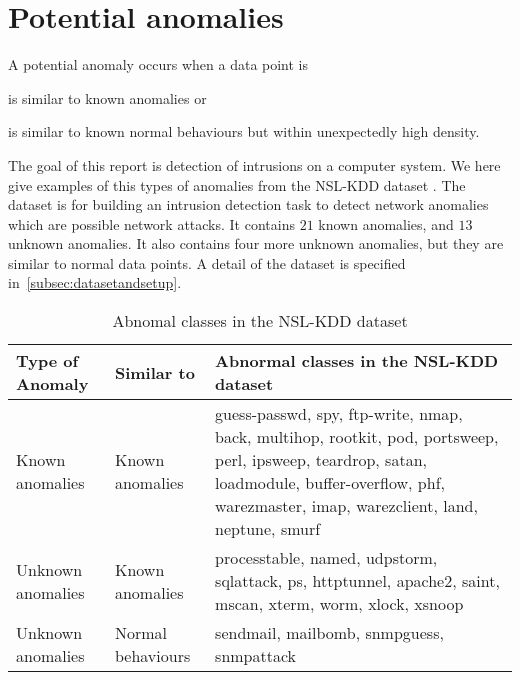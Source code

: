 \section{Potential anomalies}
A potential anomaly occurs when a data point is \begin{inparaenum}
\item is similar to known anomalies %
or 
\item is similar to known normal behaviours but within unexpectedly high density.
\end{inparaenum} 

The goal of this report is detection of intrusions on a computer system. 
We here give examples of this types of anomalies from the NSL-KDD dataset \cite{tavallaee09}. 
The dataset is for building an intrusion detection task to detect network anomalies which are possible network attacks. 
It contains $21$ known anomalies, and $13$ unknown anomalies. 
It also contains four more unknown anomalies, but they are similar to normal data points.
A detail of the dataset is specified in~\ref{subsec:datasetandsetup}. 

\begin{table}[h]
\begin{center}
\begin{tabular}{| l | l | p{5cm} |}
\hline
Type of Anomaly & Similar to & Abnormal classes in the NSL-KDD dataset \\
\hline
Known anomalies & Known anomalies & guess-passwd, spy, ftp-write, nmap, back, multihop, rootkit, pod, portsweep, perl, ipsweep, teardrop, satan, loadmodule, buffer-overflow, phf, warezmaster, imap, warezclient, land, neptune, smurf \\ %
\hline
Unknown anomalies & Known anomalies & processtable, named, udpstorm, sqlattack, ps, httptunnel, apache2, saint, mscan, xterm, worm, xlock, xsnoop \\ %
\hline
Unknown anomalies & Normal behaviours & sendmail, mailbomb, snmpguess, snmpattack \\ %
\hline
\end{tabular}
\end{center}
\caption{Abnomal classes in the NSL-KDD dataset}
\label{fig:anomalyclasses}
\end{table}
